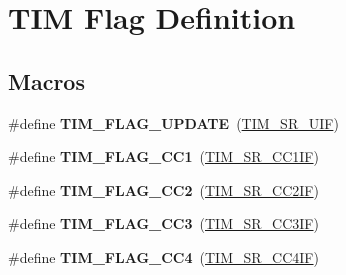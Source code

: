 \hypertarget{group___t_i_m___flag__definition}{\section{T\-I\-M Flag Definition}
\label{group___t_i_m___flag__definition}
}
\subsection*{Macros}
\begin{DoxyCompactItemize}
\item 
\hypertarget{group___t_i_m___flag__definition_gac45ce66cf33b4f324323fc3036917712}{\#define {\bfseries T\-I\-M\-\_\-\-F\-L\-A\-G\-\_\-\-U\-P\-D\-A\-T\-E}~(\hyperlink{group___peripheral___registers___bits___definition_gac8c03fabc10654d2a3f76ea40fcdbde6}{T\-I\-M\-\_\-\-S\-R\-\_\-\-U\-I\-F})}\label{group___t_i_m___flag__definition_gac45ce66cf33b4f324323fc3036917712}

\item 
\hypertarget{group___t_i_m___flag__definition_gaa7eb8be054b9bd217a9abb1c8687cc55}{\#define {\bfseries T\-I\-M\-\_\-\-F\-L\-A\-G\-\_\-\-C\-C1}~(\hyperlink{group___peripheral___registers___bits___definition_ga449a61344a97608d85384c29f003c0e9}{T\-I\-M\-\_\-\-S\-R\-\_\-\-C\-C1\-I\-F})}\label{group___t_i_m___flag__definition_gaa7eb8be054b9bd217a9abb1c8687cc55}

\item 
\hypertarget{group___t_i_m___flag__definition_ga9cae242f1c51b31839ffc5bc007c82a7}{\#define {\bfseries T\-I\-M\-\_\-\-F\-L\-A\-G\-\_\-\-C\-C2}~(\hyperlink{group___peripheral___registers___bits___definition_ga25a48bf099467169aa50464fbf462bd8}{T\-I\-M\-\_\-\-S\-R\-\_\-\-C\-C2\-I\-F})}\label{group___t_i_m___flag__definition_ga9cae242f1c51b31839ffc5bc007c82a7}

\item 
\hypertarget{group___t_i_m___flag__definition_ga052c380f922219659810e4fceb574a7c}{\#define {\bfseries T\-I\-M\-\_\-\-F\-L\-A\-G\-\_\-\-C\-C3}~(\hyperlink{group___peripheral___registers___bits___definition_gad3cf234a1059c0a04799e88382cdc0f2}{T\-I\-M\-\_\-\-S\-R\-\_\-\-C\-C3\-I\-F})}\label{group___t_i_m___flag__definition_ga052c380f922219659810e4fceb574a7c}

\item 
\hypertarget{group___t_i_m___flag__definition_gafd0dc57b56941f8b8250d66e289542db}{\#define {\bfseries T\-I\-M\-\_\-\-F\-L\-A\-G\-\_\-\-C\-C4}~(\hyperlink{group___peripheral___registers___bits___definition_gacade8a06303bf216bfb03140c7e16cac}{T\-I\-M\-\_\-\-S\-R\-\_\-\-C\-C4\-I\-F})}\label{group___t_i_m___flag__definition_gafd0dc57b56941f8b8250d66e289542db}


\end{DoxyCompactItemize}
